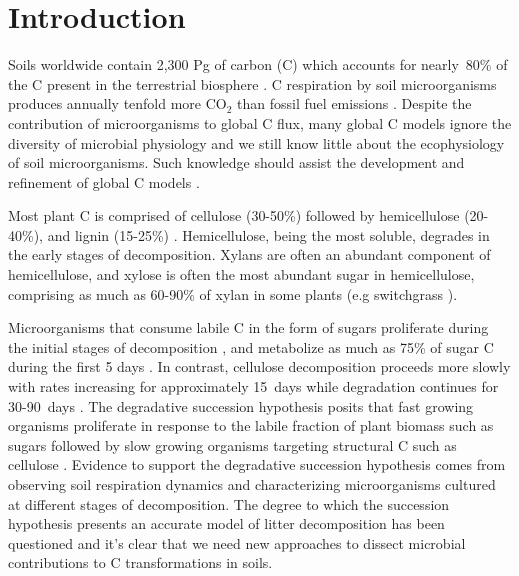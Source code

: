 \section{Introduction}
Soils worldwide contain 2,300 Pg of carbon (C) which accounts for nearly~80\%
of the C present in the terrestrial biosphere
\citep{Amundson_2001,BATJES_1996}. C respiration by soil microorganisms
produces annually tenfold more CO$_{2}$ than fossil fuel emissions
\citep{chapin2002principles}. Despite the contribution of microorganisms to
global C flux, many global C models ignore the diversity of microbial
physiology \citep{Allison2010,Six2006,Treseder2011} and we still know little
about the ecophysiology of soil microorganisms. Such knowledge should
assist the development and refinement of global C models
\citep{Bradford2008,Neff_2001,McGuire2010,Wieder2013}.

Most plant C is comprised of cellulose (30-50\%) followed by hemicellulose
(20-40\%), and lignin (15-25\%) \citep{Lynd2002}. Hemicellulose, being the most
soluble, degrades in the early stages of decomposition. Xylans are often an
abundant component of hemicellulose, and xylose is often the most abundant
sugar in hemicellulose, comprising as much as 60-90\% of xylan in some plants
(e.g  switchgrass \citep{Bunnell2013}). 

Microorganisms that consume labile C in the form of sugars proliferate during
the initial stages of decomposition \citep{Garrett1951,Alexander1964}, and
metabolize as much as 75\% of sugar C during the first 5 days
\citep{Engelking2007}. In contrast, cellulose decomposition proceeds more
slowly with rates increasing for approximately 15~days while degradation
continues for 30-90~days \citep{Hu1997,Engelking2007}. The degradative
succession hypothesis posits that fast growing organisms proliferate in
response to the labile fraction of plant biomass such as sugars
\citep{Garrett1963,Bremer1994} followed by slow growing organisms targeting
structural C such as cellulose \citep{Garrett1963}. Evidence to support the
degradative succession hypothesis comes from observing soil respiration
dynamics and characterizing microorganisms cultured at different stages of
decomposition. The degree to which the succession hypothesis presents an
accurate model of litter decomposition has been questioned
\citep{AnneliseHKjoller2002,Frankland_1998,Osono_2005} and it's clear that we
need new approaches to dissect microbial contributions to C transformations in
soils.

